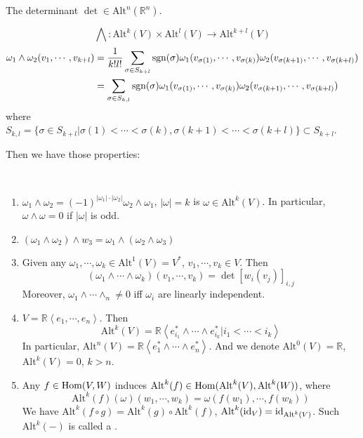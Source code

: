 The determinant  $ \det\in \mathrm{Alt}^n(\mathbb{R}^n) $.
\begin{definition}
    \[\bigwedge:\mathrm{Alt}^k(V)\times\mathrm{Alt}^l(V)\rightarrow \mathrm{Alt}^{k+l}(V)\]
    \begin{align*}
        \omega_1\wedge \omega_2(v_1,\cdots,v_{k+l})&=\displaystyle\frac{1}{k!l!}\sum_{\sigma\in S_{k+l}}\mathrm{sgn}(\sigma)\omega_1(v_{\sigma(1)},\cdots,v_{\sigma(k)})\omega_2(v_{\sigma(k+1)},\cdots,v_{\sigma(k+l)})\\
        &=\sum_{\sigma\in S_{k,l}}\mathrm{sgn}(\sigma)\omega_1(v_{\sigma(1)},\cdots,v_{\sigma(k)})\omega_2(v_{\sigma(k+1)},\cdots,v_{\sigma(k+l)})
    \end{align*}
    where  $ S_{k,l}=\{\sigma\in S_{k+l}|\sigma(1)<\cdots<\sigma(k),\sigma(k+1)<\cdots<\sigma(k+l)\} \subset S_{k+l}$. 
\end{definition}
Then we have those properties:
\begin{proposition}\label{Property of exterior product}
    \,
    \begin{enumerate}[label=(\arabic*)]
        \item  $ \omega_1\wedge \omega_2=(-1)^{|\omega_1|\cdot|\omega_2|}\omega_2\wedge \omega_1  $,  $ |\omega|=k $ is  $ \omega\in\mathrm{Alt}^k(V) $. In particular,  $ \omega\wedge \omega=0 $ if  $ |\omega| $ is odd.    
        \item  $ (\omega_1\wedge \omega_2)\wedge w_3=\omega_1\wedge(\omega_2\wedge \omega_3) $ 
        \item Given any  $ \omega_1,\cdots,\omega_k\in \mathrm{Alt}^1(V)=V^* $,  $ v_1,\cdots,v_k\in V $. Then 
        \begin{equation}
            (\omega_1\wedge \cdots \wedge \omega_k)(v_1,\cdots,v_k)=\det\left[w_i(v_j)\right]_{i,j}
        \end{equation}  
        Moreover,  $ \omega_1\wedge \cdots\wedge_n\neq 0 $ iff  $ \omega_i $ are linearly independent.
        \item  $ V=\mathbb{R}\left<e_1,\cdots,e_n\right> $. Then 
        \begin{equation}
            \mathrm{Alt}^k(V)=\mathbb{R}\left<e_{i_1}^*\wedge\cdots \wedge e_{i_k}^*|i_1<\cdots<i_k\right>
        \end{equation}  
        In particular,  $ \mathrm{Alt}^n(V)=\mathbb{R}\left<e_1^*\wedge\cdots\wedge e_n^*\right> $.
        And we denote
             $ \mathrm{Alt}^0(V)=\mathbb{R} $,  $ \mathrm{Alt}^k(V)=0 $,  $ k>n $. 
        \item Any  $ f\in \mathrm{Hom} (V,W) $ induces  $ \mathrm{Alt}^k(f)\in \mathrm{Hom}(\mathrm{Alt}^k(V),\mathrm{Alt}^k(W)) $, where 
        \begin{equation}
            \mathrm{Alt}^k(f)(\omega)(w_1,\cdots , w_k)=\omega(f(w_1),\cdots,f(w_k))
        \end{equation}
        We have   $ \mathrm{Alt}^k(f\circ g)=\mathrm{Alt}^k(g)\circ \mathrm{Alt}^k(f) $,  $ \mathrm{Alt}^k(\mathrm{id}_V)=\mathrm{id}_{\mathrm{Alt}^k(V)} $.
        Such  $ \mathrm{Alt}^k(-) $ is called  a .  
    \end{enumerate}
\end{proposition}
